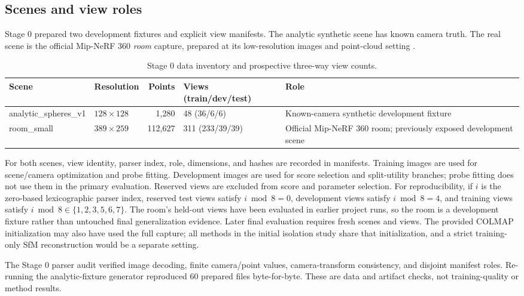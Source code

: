 \documentclass[10pt]{article}
\begin{document}
\subsection{Scenes and view roles}

Stage 0 prepared two development fixtures and explicit view manifests. The
analytic synthetic scene has known camera truth. The real scene is the
official Mip-NeRF 360 \emph{room} capture, prepared at its low-resolution
images and point-cloud setting \cite{barron2022mipnerf360}.

\begin{table}[htbp]
\centering
\small
\begin{tabularx}{\linewidth}{@{}l l r l Y@{}}
\toprule
\textbf{Scene} & \textbf{Resolution} & \textbf{Points} &
\textbf{Views (train/dev/test)} & \textbf{Role}\\
\midrule
analytic\_spheres\_v1 & \(128\times128\) & 1,280 & 48 (36/6/6) &
Known-camera synthetic development fixture\\
room\_small & \(389\times259\) & 112,627 & 311 (233/39/39) &
Official Mip-NeRF 360 room; previously exposed development scene\\
\bottomrule
\end{tabularx}
\caption{Stage 0 data inventory and prospective three-way view counts.}
\label{tab:data}
\end{table}

For both scenes, view identity, parser index, role, dimensions, and hashes are
recorded in manifests. Training images are used for scene/camera optimization
and probe fitting. Development images are used for score selection and
split-utility branches; probe fitting does not use them in the primary
evaluation. Reserved views are excluded from score and parameter selection.
For reproducibility, if \(i\) is the zero-based lexicographic parser index,
reserved test views satisfy \(i\bmod 8=0\), development views satisfy
\(i\bmod 8=4\), and training views satisfy
\(i\bmod 8\in\{1,2,3,5,6,7\}\).
The room's held-out views have been evaluated in earlier project runs, so the
room is a development fixture rather than untouched final generalization
evidence. Later final evaluation requires fresh scenes and views. The
provided COLMAP initialization may also have used the full capture; all
methods in the initial isolation study share that initialization, and a
strict training-only SfM reconstruction would be a separate setting.

The Stage 0 parser audit verified image decoding, finite camera/point values,
camera-transform consistency, and disjoint manifest roles. Re-running the
analytic-fixture generator reproduced 60 prepared files byte-for-byte. These
are data and artifact checks, not training-quality or method results.
\end{document}
